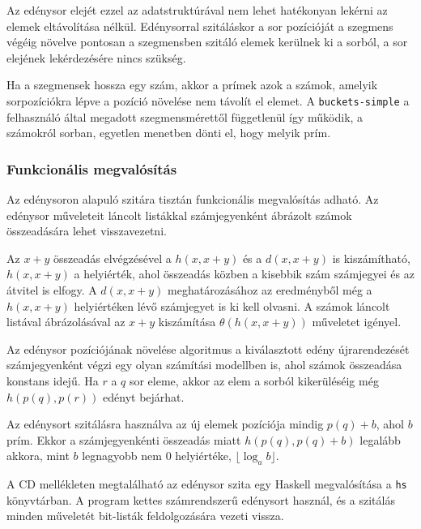 Az edénysor elejét ezzel az adatstruktúrával nem lehet hatékonyan lekérni az elemek eltávolítása nélkül.
Edénysorral szitáláskor a sor pozícióját a szegmens végéig növelve pontosan a szegmensben szitáló elemek kerülnek ki a sorból, a sor elejének lekérdezésére nincs szükség.

Ha a szegmensek hossza egy szám, akkor a prímek azok a számok, amelyik sorpozíciókra lépve a pozíció növelése nem távolít el elemet. A \texttt{buckets-simple} a felhasználó által megadott szegmensmérettől függetlenül így működik, a számokról sorban, egyetlen menetben dönti el, hogy melyik prím.

\subsubsection{Funkcionális megvalósítás}

Az edénysoron alapuló szitára tisztán funkcionális megvalósítás adható.
Az edénysor műveleteit láncolt listákkal számjegyenként ábrázolt számok összeadására lehet visszavezetni.

Az $x+y$ összeadás elvégzésével a $h(x, x+y)$ és a $d(x, x+y)$ is kiszámítható, $h(x, x+y)$ a helyiérték, ahol összeadás közben a kisebbik szám számjegyei és az átvitel is elfogy. A $d(x, x+y)$ meghatározásához az eredményből még a $h(x, x+y)$ helyiértéken lévő számjegyet is ki kell olvasni.
A számok láncolt listával ábrázolásával az $x+y$ kiszámítása $\theta(h(x, x+y))$ műveletet igényel.

Az edénysor pozíciójának növelése algoritmus a kiválasztott edény újrarendezését számjegyenként végzi egy olyan számítási modellben is, ahol számok összeadása konstans idejű.
Ha $r$ a $q$ sor eleme, akkor az elem a sorból kikerüléséig még $h(p(q), p(r))$ edényt bejárhat.

Az edénysort szitálásra használva az új elemek pozíciója mindig $p(q)+b$, ahol $b$ prím.
Ekkor a számjegyenkénti összeadás miatt $h(p(q), p(q)+b)$ legalább akkora, mint $b$ legnagyobb nem $0$ helyiértéke, $\lfloor \log_{a}{b} \rfloor$.

A CD mellékleten megtalálható az edénysor szita egy Haskell megvalósítása a \texttt{hs} könyvtárban.
A program kettes számrendszerű edénysort használ, és a szitálás minden műveletét bit-listák feldolgozására vezeti vissza.

